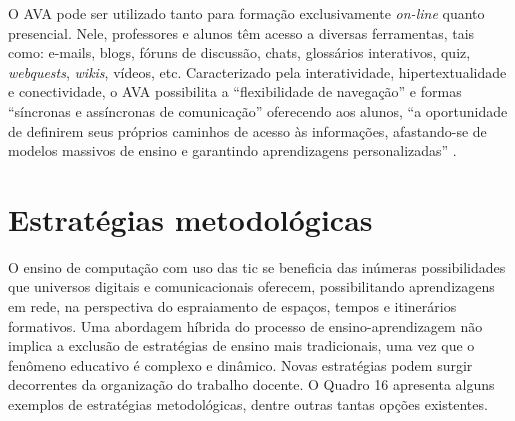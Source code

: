 \documentclass[
	12pt,				%
	openright,			%
  oneside,     %
	a4paper,			%
 hyphens,
	chapter=TITLE,		%
	english,			%
	french,				%
	spanish,			%
	brazil				%
	]{abntex2}
\begin{document}
O AVA pode ser utilizado tanto para formação exclusivamente \textit{on-line} quanto presencial. Nele, professores e alunos têm acesso a diversas ferramentas, tais como: e-mails, blogs, fóruns de discussão, chats, glossários interativos, quiz, \textit{webquests}, \textit{wikis}, vídeos, etc. Caracterizado pela interatividade, hipertextualidade e conectividade, o AVA possibilita a ``flexibilidade de navegação'' e formas ``síncronas e assíncronas de comunicação'' oferecendo aos alunos, ``a oportunidade de definirem seus próprios caminhos de acesso às informações, afastando-se de modelos massivos de ensino e garantindo aprendizagens personalizadas'' \cite[p.~5]{silva2013interfaces}.

\section{Estratégias metodológicas}

O ensino de computação com uso das \acrshort{tic} se beneficia das inúmeras possibilidades que universos digitais e comunicacionais oferecem, possibilitando aprendizagens em rede, na perspectiva do espraiamento de espaços, tempos e itinerários formativos. Uma abordagem híbrida do processo de ensino-aprendizagem não implica a exclusão de estratégias de ensino mais tradicionais, uma vez que o fenômeno educativo é complexo e dinâmico. Novas estratégias podem surgir decorrentes da organização do trabalho docente. O Quadro 16 apresenta alguns exemplos de estratégias metodológicas, dentre outras tantas opções existentes.
\end{document}
